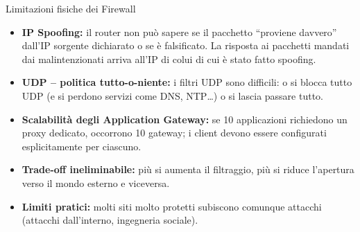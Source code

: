 \documentclass[a4paper,12pt]{report}
\begin{document}
\begin{urgentbox}{Limitazioni fisiche dei Firewall}
\begin{itemize}[noitemsep]
  \item \textbf{IP Spoofing:} il router non pu\`o sapere se il pacchetto
        ``proviene davvero'' dall'IP sorgente dichiarato o se \`e falsificato. La risposta ai pacchetti mandati dai malintenzionati arriva all'IP di colui di cui è stato fatto spoofing.
  \item \textbf{UDP -- politica tutto-o-niente:} i filtri UDP sono difficili:
        o si blocca tutto UDP (e si perdono servizi come DNS, NTP\ldots)
        o si lascia passare tutto.
  \item \textbf{Scalabilit\`a degli Application Gateway:}
        se 10 applicazioni richiedono un proxy dedicato, occorrono 10 gateway;
        i client devono essere configurati esplicitamente per ciascuno.
  \item \textbf{Trade-off ineliminabile:} pi\`u si aumenta il filtraggio,
        pi\`u si riduce l'apertura verso il mondo esterno e viceversa.
  \item \textbf{Limiti pratici:} molti siti molto protetti subiscono comunque attacchi
        (attacchi dall'interno, ingegneria sociale).
\end{itemize}
\end{urgentbox}

\newpage
\end{document}
